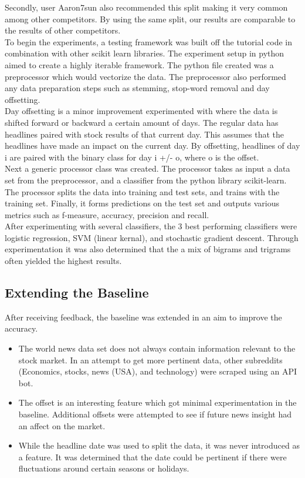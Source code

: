 \documentclass[11pt,a4paper]{article}
\begin{document}
Secondly, user Aaron7sun also recommended this split making it very common among other competitors. By using the same split, our results are comparable to the results of other competitors.\\

To begin the experiments, a testing framework was built off the tutorial code in combination with other scikit learn libraries. The experiment setup in python aimed to create a highly iterable framework. The python file created was a preprocessor which would vectorize the data. The preprocessor also performed any data preparation steps such as stemming, stop-word removal and day offsetting.\\

Day offsetting is a minor improvement experimented with where the data is shifted forward or backward a certain amount of days. The regular data has headlines paired with stock results of that current day. This assumes that the headlines have made an impact on the current day. By offsetting, headlines of day i are paired with the binary class for day i +/- o, where o is the offset.\\

Next a generic processor class was created. The processor takes as input a data set from the preprocessor, and a classifier from the python library scikit-learn. The processor splits the data into training and test sets, and trains with the training set. Finally, it forms predictions on the test set and outputs various metrics such as f-measure, accuracy, precision and recall.\\

After experimenting with several classifiers, the 3 best performing classifiers were logistic regression, SVM (linear kernal), and stochastic gradient descent. Through experimentation it was also determined that the a mix of bigrams and trigrams often yielded the highest results.

\subsection{Extending the Baseline}
After receiving feedback, the baseline was extended in an aim to improve the accuracy.
\begin{itemize}
\item The world news data set does not always contain information relevant to the stock market. In an attempt to get more pertinent data, other subreddits (Economics, stocks, news (USA), and technology) were scraped using an API bot.

\item The offset is an interesting feature which got minimal experimentation in the baseline. Additional offsets were attempted to see if future news insight had an affect on the market.

\item While the headline date was used to split the data, it was never introduced as a feature. It was determined that the date could be pertinent if there were fluctuations around certain seasons or holidays.
\end{itemize}
\end{document}
